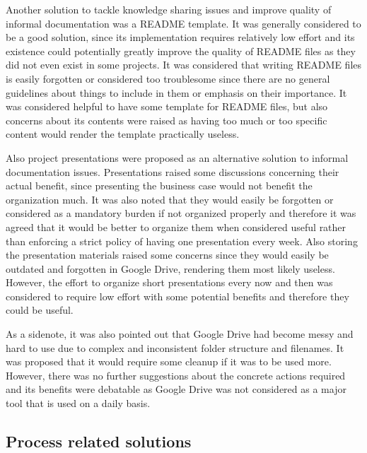 Another solution to tackle knowledge sharing issues and improve quality of informal documentation was a README template. It was generally considered to be a good solution, since
its implementation requires relatively low effort and its existence could potentially greatly improve the quality of README files as they did not even exist in some projects.
It was considered that writing README files is easily forgotten or considered too troublesome since there are no general guidelines about things to include in them or
emphasis on their importance. It was considered helpful to have some template for README files, but also concerns about its contents were raised as having too much or too
specific content would render the template practically useless.

Also project presentations were proposed as an alternative solution to informal documentation issues. Presentations raised some discussions concerning their actual benefit,
since presenting the business case would not benefit the organization much. It was also noted that they would easily be forgotten or considered as a mandatory burden if
not organized properly and therefore it was agreed that it would be better to organize them when considered useful rather than enforcing a strict policy of having
one presentation every week. Also storing the presentation materials raised some concerns since they would easily be outdated and forgotten in Google Drive,
rendering them most likely useless. However, the effort to organize short presentations every now and then was considered to require low effort with some potential benefits
and therefore they could be useful.

As a sidenote, it was also pointed out that Google Drive had become messy and hard to use due to complex and inconsistent folder structure and filenames. It was proposed
that it would require some cleanup if it was to be used more. However, there was no further suggestions about the concrete actions required and its benefits were debatable
as Google Drive was not considered as a major tool that is used on a daily basis.

\subsection{Process related solutions}

